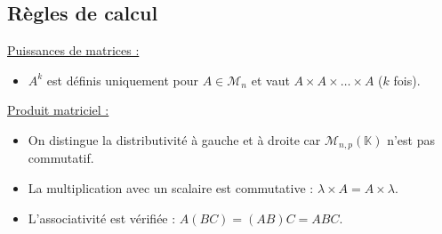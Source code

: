     
    \subsection{Règles de calcul}
        
        \underline{Puissances de matrices :}
        \begin{itemize}
            \item $A^k$ est définis uniquement pour $A \in \mathcal{M}_{n}$ et vaut $A \times A \times \dots \times A$ ($k$ fois).\vspace{5pt}
        \end{itemize}
        
        \underline{Produit matriciel :}
        \begin{itemize}
            \item On distingue la distributivité à gauche et à droite car $\mathcal{M}_{n,p}(\mathbb{K})$ n'est pas commutatif.
            \item La multiplication avec un scalaire est commutative : $\lambda \times A = A \times \lambda$.
            \item L'associativité est vérifiée : $A(B C) = (A B) C = ABC$.\vspace{5pt}
        \end{itemize}
        
